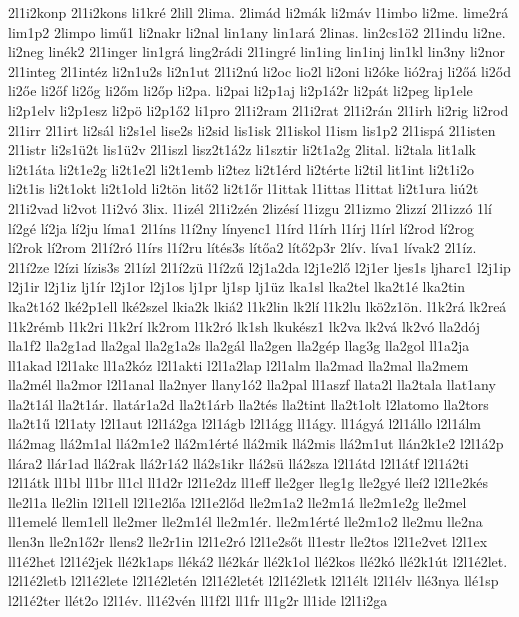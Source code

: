 {2l1i2konp
2l1i2kons
li1kré
2lill
2lima.
2limád
li2mák
li2máv
l1imbo
li2me.
lime2rá
lim1p2
2limpo
limű1
li2nakr
li2nal
lin1any
lin1ará
2linas.
lin2cs1ö2
2l1indu
li2ne.
li2neg
linék2
2l1inger
lin1grá
ling2rádi
2l1ingré
lin1ing
lin1inj
lin1kl
lin3ny
li2nor
2l1integ
2l1intéz
li2n1u2s
li2n1ut
2l1i2nú
li2oc
lio2l
li2oni
li2óke
lió2raj
li2őá
li2őd
li2őe
li2őf
li2őg
li2őm
li2őp
li2pa.
li2pai
li2p1aj
li2p1á2r
li2pát
li2peg
lip1ele
li2p1elv
li2p1esz
li2pö
li2p1ő2
li1pro
2l1i2ram
2l1i2rat
2l1i2rán
2l1irh
li2rig
li2rod
2l1irr
2l1irt
li2sál
li2s1el
lise2s
li2sid
lis1isk
2l1iskol
l1ism
lis1p2
2l1ispá
2l1isten
2l1istr
li2s1ü2t
lis1ü2v
2l1iszl
lisz2t1á2z
li1sztir
li2t1a2g
2lital.
li2tala
lit1alk
li2t1áta
li2t1e2g
li2t1e2l
li2t1emb
li2tez
li2t1érd
li2térte
li2til
lit1int
li2t1i2o
li2t1is
li2t1okt
li2t1old
li2tön
litő2
li2t1őr
l1ittak
l1ittas
l1ittat
li2t1ura
liú2t
2l1i2vad
li2vot
l1i2vó
3lix.
l1izél
2l1i2zén
2lizésí
l1izgu
2l1izmo
2lizzí
2l1izzó
1lí
lí2gé
lí2ja
lí2ju
líma1
2l1íns
l1í2ny
línyenc1
l1írd
l1írh
l1írj
l1írl
lí2rod
lí2rog
lí2rok
lí2rom
2l1í2ró
l1írs
l1í2ru
lítés3s
lítőa2
lítő2p3r
2lív.
líva1
lívak2
2l1íz.
2l1í2ze
l2ízi
lízis3s
2l1ízl
2l1í2zü
l1í2zű
l2j1a2da
l2j1e2lő
l2j1er
ljes1s
ljharc1
l2j1ip
l2j1ir
l2j1iz
lj1ír
l2j1or
l2j1os
lj1pr
lj1sp
lj1üz
lka1sl
lka2tel
lka2t1é
lka2tin
lka2t1ó2
lké2p1ell
lké2szel
lkia2k
lkiá2
l1k2lin
lk2lí
l1k2lu
lkö2z1ön.
l1k2rá
lk2reá
l1k2rémb
l1k2ri
l1k2rí
lk2rom
l1k2ró
lk1sh
lkukész1
lk2va
lk2vá
lk2vó
lla2dój
lla1f2
lla2g1ad
lla2gal
lla2g1a2s
lla2gál
lla2gen
lla2gép
llag3g
lla2gol
ll1a2ja
ll1akad
l2l1akc
ll1a2kóz
l2l1akti
l2l1a2lap
l2l1alm
lla2mad
lla2mal
lla2mem
lla2mél
lla2mor
l2l1anal
lla2nyer
llany1ó2
lla2pal
ll1aszf
llata2l
lla2tala
llat1any
lla2t1ál
lla2t1ár.
llatár1a2d
lla2t1árb
lla2tés
lla2tint
lla2t1olt
l2latomo
lla2tors
lla2t1ű
l2l1aty
l2l1aut
l2l1á2ga
l2l1ágb
l2l1ágg
ll1ágy.
ll1ágyá
l2l1állo
l2l1álm
llá2mag
llá2m1al
llá2m1e2
llá2m1érté
llá2mik
llá2mis
llá2m1ut
llán2k1e2
l2l1á2p
llára2
llár1ad
llá2rak
llá2r1á2
llá2s1ikr
llá2sü
llá2sza
l2l1átd
l2l1átf
l2l1á2ti
l2l1átk
ll1bl
ll1br
ll1cl
ll1d2r
l2l1e2dz
ll1eff
lle2ger
lleg1g
lle2gyé
lleí2
l2l1e2kés
lle2l1a
lle2lin
l2l1ell
l2l1e2lőa
l2l1e2lőd
lle2m1a2
lle2m1á
lle2m1e2g
lle2mel
ll1emelé
llem1ell
lle2mer
lle2m1él
lle2m1ér.
lle2m1érté
lle2m1o2
lle2mu
lle2na
llen3n
lle2n1ő2r
llens2
lle2r1in
l2l1e2ró
l2l1e2sőt
ll1estr
lle2tos
l2l1e2vet
l2l1ex
ll1é2het
l2l1é2jek
llé2k1aps
lléká2
llé2kár
llé2k1ol
llé2kos
llé2kó
llé2k1út
l2l1é2let.
l2l1é2letb
l2l1é2lete
l2l1é2letén
l2l1é2letét
l2l1é2letk
l2l1élt
l2l1élv
llé3nya
llé1sp
l2l1é2ter
llét2o
l2l1év.
ll1é2vén
ll1f2l
ll1fr
ll1g2r
ll1ide
l2l1i2ga
}
